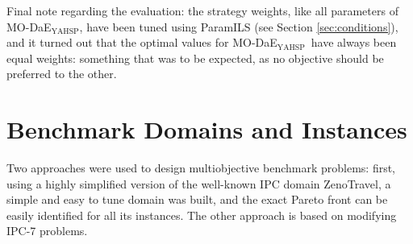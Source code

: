 \documentclass{article}
\newcommand{\MODAEYAHSP}{{\sc MO-DaE$_{\text{YAHSP}}$}}
\newcommand{\ZENOTRAVEL}{{\sc ZenoTravel}}
\begin{document}
Final note regarding the evaluation: the strategy weights, like all parameters of \MODAEYAHSP, have been tuned using ParamILS (see Section \ref{sec:conditions}), and it turned out that the optimal values for \MODAEYAHSP\ have always been equal weights: something that was to be expected, as no objective should be preferred to the other. 

\section{Benchmark Domains and Instances}
\label{sec:benchmarks}
Two approaches were used to design multiobjective benchmark problems: first, using a highly simplified version of the well-known IPC domain \ZENOTRAVEL, a simple and easy to tune domain was built, and the exact Pareto front can be easily identified for all its instances. The other approach is based on modifying IPC-7 problems.
\end{document}
